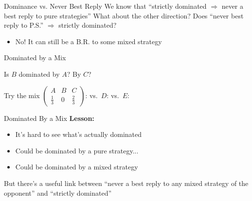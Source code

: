 \begin{frame}{Dominance vs. Never Best Reply}
We know that ``strictly dominated $\Rightarrow$ never a best reply to pure strategies''
\bsk
What about the other direction? Does ``never best reply to P.S.'' $\Rightarrow$ strictly dominated?
    \begin{itemize}
        \item No! It can still be a B.R. to some mixed strategy
    \end{itemize}
\end{frame}

\begin{frame}{Dominated by a Mix}
\centering
\begin{matrixgame}[top={D, E}, left={A, B, C}, player names={Player 1, Player 2}]
\end{matrixgame}
\bsk
\raggedright
Is $B$ dominated by $A$? By $C$? \vspace{0.3in}

Try the mix $\begin{pmatrix} A & B & C \\ \tfrac13 & 0 & \tfrac23\end{pmatrix}$:
\hspace{0.3in} vs.\ $D$: \hspace{0.8in} vs.\ $E$:
\bsk
{}
\vspace{-0.3in}
\end{frame}

\begin{frame}{Dominated By a Mix}
    \textbf{Lesson:}
    \begin{itemize}
        \item It's hard to see what's actually dominated
        \item Could be dominated by a pure strategy...
        \item Could be dominated by a mixed strategy
    \end{itemize}
    \bsk
    But there's a useful link between ``never a best reply to any mixed strategy of the opponent'' and ``strictly dominated''
\end{frame}

